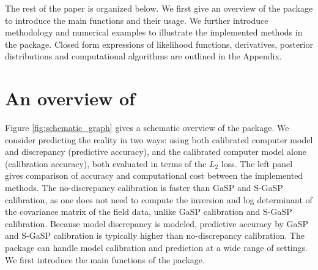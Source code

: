 The rest of the paper is organized below. {We first give an overview of the  package to introduce the main functions and their usage.    We further introduce methodology and numerical examples to illustrate the implemented methods in the  package.     Closed form expressions of likelihood functions, derivatives,  posterior distributions and computational algorithms are outlined in the Appendix. }


\section[An overview of \CRANpkg{RobustCalibration}]{An overview of }


  Figure \ref{fig:schematic_graph} gives a schematic overview of the   package. We consider predicting the reality in two ways:  using both calibrated computer model and discrepancy (predictive accuracy), and the calibrated computer model alone (calibration accuracy), both evaluated in terms of the $L_2$ loss. The left panel gives comparison of accuracy and computational cost between the implemented methods. {%
  The no-discrepancy calibration is  faster than GaSP and S-GaSP calibration, as one does not need to compute the inversion and log determinant of the covariance matrix of the field data, unlike GaSP calibration and S-GaSP calibration.} 
    Because model discrepancy is modeled,  predictive accuracy by GaSP and S-GaSP calibration is typically higher than no-discrepancy calibration. The  package can handle model calibration and prediction at a wide range of settings. We first introduce the main functions of the package. 
  
   



